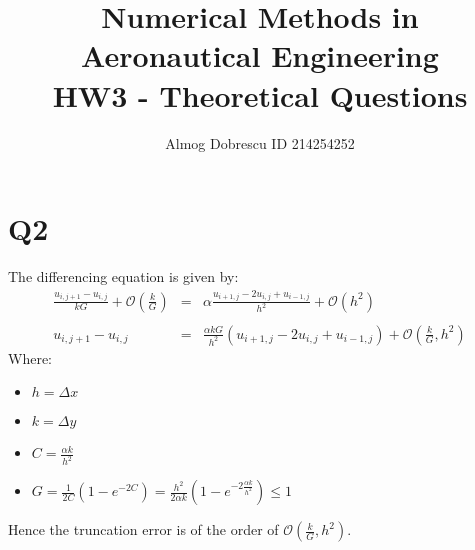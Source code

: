 \documentclass[11pt, a4paper]{article}
\title{Numerical Methods in Aeronautical Engineering \\ HW3 - Theoretical Questions}
\author{Almog Dobrescu ID 214254252}
\begin{document}
\maketitle
\thispagestyle{empty}
\newpage


\tableofcontents
\newpage

\pagestyle{fancy}
\setcounter{page}{1}

\section{Q2}
The differencing equation is given by:
\begin{equation}
    \begin{array}{rcl}
        \displaystyle \frac{u_{i,j+1}-u_{i,j}}{kG}+\mathcal{O}\left(\frac{k}{G}\right) & = & \displaystyle \alpha\frac{u_{i+1,j}-2u_{i,j}+u_{i-1,j}}{h^2}+\mathcal{O}\left(h^2\right) \\\\
        u_{i,j+1}-u_{i,j} & = & \displaystyle \frac{\alpha kG}{h^2}\left(u_{i+1,j}-2u_{i,j}+u_{i-1,j}\right)+\mathcal{O}\left(\frac{k}{G},h^2\right)
    \end{array}
\end{equation}
Where:
\begin{itemize}
    \item $h=\Delta x$
    \item $k=\Delta y$
    \item $C=\displaystyle\frac{\alpha k}{h^2}$
    \item $G=\displaystyle\frac{1}{2C}\left(1-e^{-2C}\right)=\displaystyle\frac{h^2}{2\alpha k}\left(1-e^{-2\frac{\alpha k}{h^2}}\right)\le1$
\end{itemize}
Hence the truncation error is of the order of $\mathcal{O}\left(\frac{k}{G},h^2\right)$. \\
\end{document}

